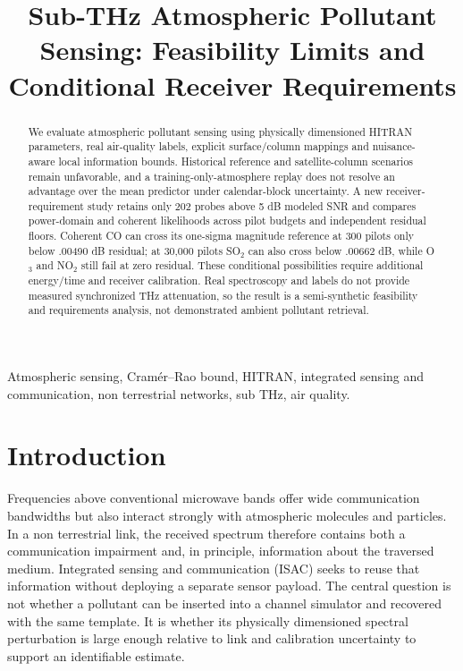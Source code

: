 \documentclass[conference]{IEEEtran}
\title{Sub-THz Atmospheric Pollutant Sensing: Feasibility Limits and Conditional Receiver Requirements}
\author{
\IEEEauthorblockN{Guillem Moreno Garcia}
\IEEEauthorblockA{
Universitat Polit\`ecnica de Catalunya\\
Email: guillem.moreno.garcia@estudiantat.upc.edu}
}
\begin{document}
\maketitle

\begin{abstract}
We evaluate atmospheric pollutant sensing using physically dimensioned HITRAN parameters, real air-quality labels, explicit surface/column mappings and nuisance-aware local information bounds. Historical reference and satellite-column scenarios remain unfavorable, and a training-only-atmosphere replay does not resolve an advantage over the mean predictor under calendar-block uncertainty. A new receiver-requirement study retains only 202 probes above 5 dB modeled SNR and compares power-domain and coherent likelihoods across pilot budgets and independent residual floors. Coherent CO can cross its one-sigma magnitude reference at 300 pilots only below .00490 dB residual; at 30,000 pilots SO$_2$ can also cross below .00662 dB, while O$_3$ and NO$_2$ still fail at zero residual. These conditional possibilities require additional energy/time and receiver calibration. Real spectroscopy and labels do not provide measured synchronized THz attenuation, so the result is a semi-synthetic feasibility and requirements analysis, not demonstrated ambient pollutant retrieval.
\end{abstract}

\begin{IEEEkeywords}
Atmospheric sensing, Cram\'er--Rao bound, HITRAN, integrated sensing and communication, non terrestrial networks, sub THz, air quality.
\end{IEEEkeywords}

\section{Introduction}

Frequencies above conventional microwave bands offer wide communication bandwidths but also interact strongly with atmospheric molecules and particles. In a non terrestrial link, the received spectrum therefore contains both a communication impairment and, in principle, information about the traversed medium. Integrated sensing and communication (ISAC) seeks to reuse that information without deploying a separate sensor payload. The central question is not whether a pollutant can be inserted into a channel simulator and recovered with the same template. It is whether its physically dimensioned spectral perturbation is large enough relative to link and calibration uncertainty to support an identifiable estimate.
\end{document}
